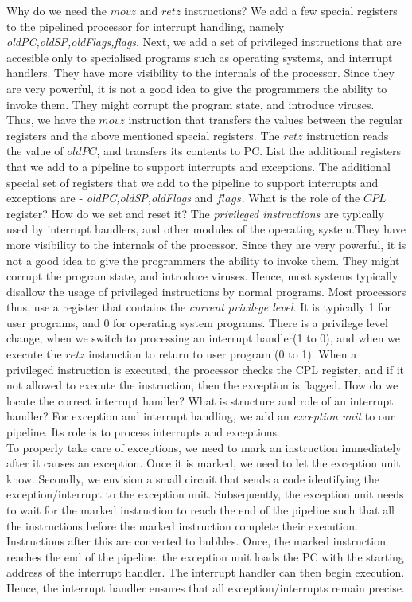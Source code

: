 \begin{ExerciseList}
\Exercise
Why do we need the $movz$ and $retz$ instructions?
\Answer
We add a few special registers to the pipelined processor for interrupt handling, namely \textit{oldPC,oldSP,oldFlags,flags}. Next, we add a set of privileged instructions that are accesible only to specialised programs such as operating systems, and interrupt handlers. They have more visibility to the internals of the processor. Since they are very powerful, it is not a good idea to give the programmers the ability to invoke them. They might corrupt the program state, and introduce viruses. \\
Thus, we have the $movz$ instruction that transfers the values between the regular registers and the above mentioned special registers. The $retz$ instruction reads the value of $oldPC$, and transfers its contents to PC. 
\Exercise
List the additional registers that we add to a pipeline to support interrupts and exceptions.
\Answer
The additional special set of registers that we add to the pipeline to support interrupts and exceptions are - \textit{oldPC,oldSP,oldFlags} and $flags$. 
\Exercise
What is the role of the $CPL$ register? How do we set and reset it?
\Answer
The \textit{privileged instructions} are typically used by interrupt handlers, and other modules of the operating system.They have more visibility to the internals of the processor. Since they are very powerful, it is not a good idea to give the programmers the ability to invoke them. They might corrupt the program state, and introduce viruses. Hence, most systems typically disallow the usage of privileged instructions by normal programs. Most processors thus, use a register that contains the \textit{current privilege level}. It is typically 1 for user programs, and 0 for operating system programs. There is a privilege level change, when we switch to processing an interrupt handler(1 to 0), and when we execute the $retz$ instruction to return to user program (0 to 1). When a privileged instruction is executed, the processor checks the CPL register, and if it not allowed to execute the instruction, then the exception is flagged.  
\Exercise
How do we locate the correct interrupt handler? What is structure and role of an interrupt
handler?
\Answer
For exception and interrupt handling, we add an \textit{exception unit} to our pipeline. Its role is to process interrupts and exceptions.\\
To properly take care of exceptions, we need to mark an instruction immediately after it causes an exception. Once it is marked, we need to let the exception unit know. Secondly, we envision a small circuit that sends a code identifying the exception/interrupt to the exception unit. Subsequently, the exception unit needs to wait for the marked instruction to reach the end of the pipeline such that all the instructions before the marked instruction complete their execution. Instructions after this are converted to bubbles. Once, the marked instruction reaches the end of the pipeline, the exception unit loads the PC with the starting address of the interrupt handler. The interrupt handler can then begin execution. Hence, the interrupt handler ensures that all exception/interrupts remain precise.

\end{ExerciseList}
